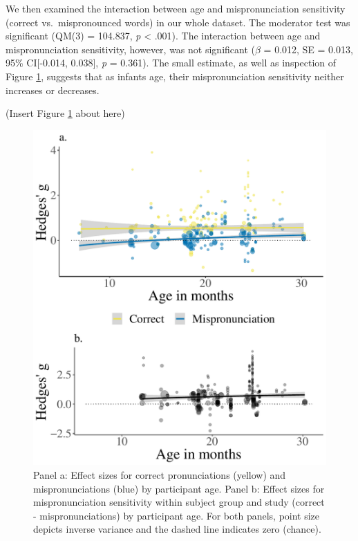\documentclass[
  english,
  man, noextraspace]{apa6}
\begin{document}
We then examined the interaction between age and mispronunciation sensitivity (correct vs.~mispronounced words) in our whole dataset. The moderator test was significant (QM(3) = 104.837, \emph{p} \textless{} .001). The interaction between age and mispronunciation sensitivity, however, was not significant (\(\beta\) = 0.012, SE = 0.013, 95\% CI{[}-0.014, 0.038{]}, \emph{p} = 0.361). The small estimate, as well as inspection of Figure \ref{fig:PlotMPEffect}, suggests that as infants age, their mispronunciation sensitivity neither increases or decreases.

(Insert Figure \ref{fig:PlotMPEffect} about here)

\begin{figure}
\centering
\includegraphics{VonHolzenBergmann_MPMetaAnalysis_files/figure-latex/PlotMPEffect-1.pdf}
\caption{\label{fig:PlotMPEffect}Panel a: Effect sizes for correct pronunciations (yellow) and mispronunciations (blue) by participant age. Panel b: Effect sizes for mispronunciation sensitivity within subject group and study (correct - mispronunciations) by participant age. For both panels, point size depicts inverse variance and the dashed line indicates zero (chance).}
\end{figure}
\end{document}
